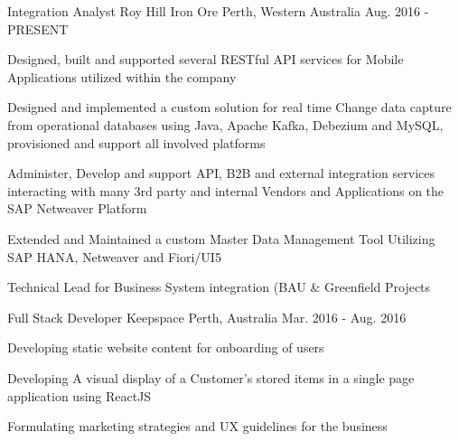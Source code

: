 

\begin{cventries}

  \cventry
    {Integration Analyst } %
    {Roy Hill Iron Ore} %
    {Perth, Western Australia} %
    {Aug. 2016 - PRESENT} %
    {
      \begin{cvitems} %
        \item {Designed,  built and supported several RESTful API services for Mobile Applications utilized within the company}
        \item {Designed and implemented a custom solution for real time Change data capture from operational databases using Java, Apache Kafka, Debezium and MySQL, provisioned and support all involved platforms}
        \item {Administer, Develop and support API, B2B and external integration services interacting with many 3rd party and internal Vendors and Applications on the SAP Netweaver Platform}
        \item {Extended and Maintained a custom Master Data Management Tool Utilizing SAP HANA, Netweaver and Fiori/UI5}
        \item {Technical Lead for Business System integration (BAU \& Greenfield Projects }
      \end{cvitems}
    }

  \cventry
    {Full Stack Developer} %
    {Keepspace} %
    {Perth, Australia} %
    {Mar. 2016 - Aug. 2016} %
    {
      \begin{cvitems} %
        \item {Developing static website content for onboarding of users}
        \item {Developing A visual display of a Customer’s stored items in a single page application using ReactJS }
        \item {Formulating marketing strategies and UX guidelines for the business}
      \end{cvitems}
    }


\end{cventries}
